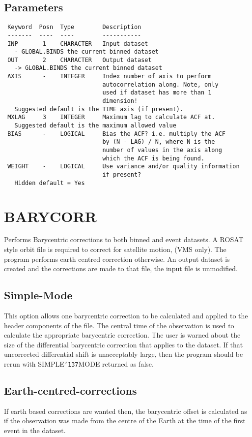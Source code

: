 \documentclass{book}
\renewcommand{\_}{{\tt\char'137}}     %
\begin{document}
\subsection{Parameters}
\begin{verbatim}
 Keyword  Posn  Type        Description
 -------  ----  ----        -----------
 INP       1    CHARACTER   Input dataset
   - GLOBAL.BINDS the current binned dataset
 OUT       2    CHARACTER   Output dataset
   -> GLOBAL.BINDS the current binned dataset
 AXIS      -    INTEGER     Index number of axis to perform
                            autocorrelation along. Note, only
                            used if dataset has more than 1
                            dimension!
   Suggested default is the TIME axis (if present).
 MXLAG     3    INTEGER     Maximum lag to calculate ACF at.
   Suggested default is the maximum allowed value
 BIAS      -    LOGICAL     Bias the ACF? i.e. multiply the ACF
                            by (N - LAG) / N, where N is the
                            number of values in the axis along
                            which the ACF is being found.
 WEIGHT    -    LOGICAL     Use variance and/or quality information
                            if present?
   Hidden default = Yes

\end{verbatim}\section{BARYCORR}
Performs Barycentric corrections to both binned and event datasets.
A ROSAT style orbit file is required to correct for satellite motion,
(VMS only). The program performs earth centred correction otherwise.
An output dataset is created and the corrections are made to that file,
the input file is unmodified.

\subsection{Simple-Mode}
This option allows one barycentric correction to be calculated and
applied to the header components of the file. The central time of the
observation is used to calculate the appropriate barycentric correction.
The user is warned about the size of the differential barycentric
correction that applies to the dataset. If that uncorrected differential
shift is unacceptably large, then the program should be rerun with
SIMPLE\_MODE returned as false.

\subsection{Earth-centred-corrections}
If earth based corrections are wanted then, the barycentric offset is
calculated as if the observation was made from the centre of the Earth
at the time of the first event in the dataset.
\end{document}
